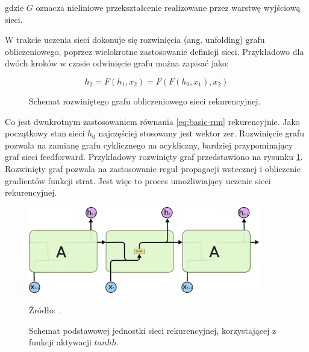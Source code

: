 \documentclass[oneside, mag]{mgr}
\begin{document}
gdzie $G$ oznacza nieliniowe przekształcenie realizowane przez warstwę wyjściową sieci.

W trakcie uczenia sieci dokonuje się rozwinięcia (ang. unfolding) grafu obliczeniowego, poprzez wielokrotne zastosowanie definicji sieci. Przykładowo dla dwóch kroków w czasie odwinięcie grafu można zapisać jako:

\begin{equation}
	h_2 = F(h_1, x_2) = F(F(h_0, x_1), x_2)
\end{equation}

\begin{figure}[h]
\centering
{}
\caption{Schemat rozwiniętego grafu obliczeniowego sieci rekurencyjnej.}
\label{fig:unfolded}
\end{figure}

Co jest dwukrotnym zastosowaniem równania \ref{eq:basic-rnn} rekurencyjnie. Jako początkowy stan sieci $h_0$ najczęściej stosowany jest wektor zer. Rozwinięcie grafu pozwala na zamianę grafu cyklicznego na acykliczny, bardziej przypominający graf sieci feedforward. Przykładowy rozwinięty graf przedstawiono na rysunku \ref{fig:unfolded}. Rozwinięty graf pozwala na zastosowanie reguł propagacji wstecznej i obliczenie gradientów funkcji strat. Jest więc to proces umożliwiający uczenie sieci rekurencyjnej.

\begin{figure}
\centering
	\includegraphics[width=0.9\textwidth]{img/LSTM3-SimpleRNN.png}
	\caption{Schemat podstawowej jednostki sieci rekurencyjnej, korzystającej z funkcji aktywacji $tanhh$.} Źródło: \cite{colah}.
	\label{fig:simple_rnn}
\end{figure}
\end{document}

